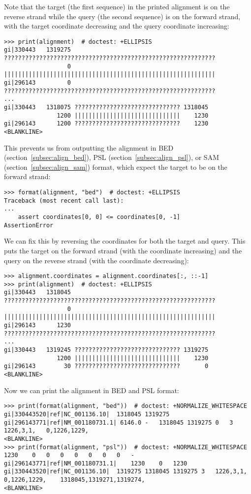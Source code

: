 Note that the target (the first sequence) in the printed alignment is on the reverse strand while the query (the second sequence) is on the forward strand, with the target coordinate decreasing and the query coordinate increasing:
\begin{verbatim}
>>> print(alignment)  # doctest: +ELLIPSIS
gi|330443   1319275 ????????????????????????????????????????????????????????????
                  0 ||||||||||||||||||||||||||||||||||||||||||||||||||||||||||||
gi|296143         0 ????????????????????????????????????????????????????????????
...
gi|330443   1318075 ?????????????????????????????? 1318045
               1200 ||||||||||||||||||||||||||||||    1230
gi|296143      1200 ??????????????????????????????    1230
<BLANKLINE>
\end{verbatim}
This prevents us from outputting the alignment in BED (section~\ref{subsec:align_bed}), PSL (section~\ref{subsec:align_psl}), or SAM (section~\ref{subsec:align_sam}) format, which expect the target to be on the forward strand:
\begin{verbatim}
>>> format(alignment, "bed")  # doctest: +ELLIPSIS
Traceback (most recent call last):
...
    assert coordinates[0, 0] <= coordinates[0, -1]
AssertionError
\end{verbatim}
We can fix this by reversing the coordinates for both the target and query.
This puts the target on the forward strand (with the coordinate increasing) and the query on the reverse strand (with the coordinate decreasing):
\begin{verbatim}
>>> alignment.coordinates = alignment.coordinates[:, ::-1]
>>> print(alignment)  # doctest: +ELLIPSIS
gi|330443   1318045 ????????????????????????????????????????????????????????????
                  0 ||||||||||||||||||||||||||||||||||||||||||||||||||||||||||||
gi|296143      1230 ????????????????????????????????????????????????????????????
...
gi|330443   1319245 ?????????????????????????????? 1319275
               1200 ||||||||||||||||||||||||||||||    1230
gi|296143        30 ??????????????????????????????       0
<BLANKLINE>
\end{verbatim}
Now we can print the alignment in BED and PSL format:
\begin{verbatim}
>>> print(format(alignment, "bed"))  # doctest: +NORMALIZE_WHITESPACE
gi|330443520|ref|NC_001136.10|	1318045	1319275	gi|296143771|ref|NM_001180731.1| 6146.0	-	1318045	1319275	0	3	1226,3,1,	0,1226,1229,
<BLANKLINE>
>>> print(format(alignment, "psl"))  # doctest: +NORMALIZE_WHITESPACE
1230	0	0	0	0	0	0	0	-	gi|296143771|ref|NM_001180731.1|	1230	0	1230	gi|330443520|ref|NC_001136.10|	1319275	1318045	1319275	3	1226,3,1,	0,1226,1229,	1318045,1319271,1319274,
<BLANKLINE>
\end{verbatim}
